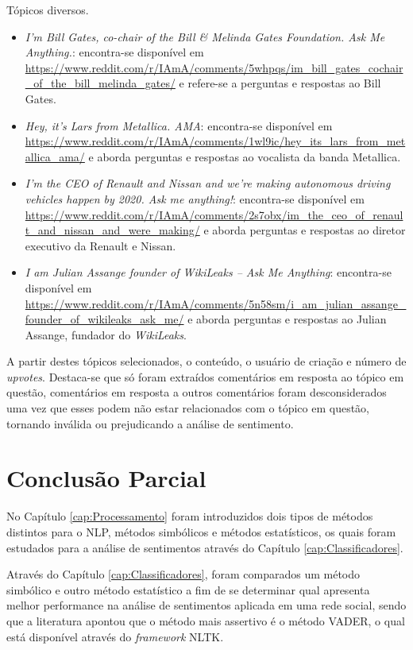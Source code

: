 Tópicos diversos.
\begin{itemize}
  \item
  \textit{I’m Bill Gates, co-chair of the Bill \& Melinda Gates Foundation. Ask
  Me Anything.}: encontra-se disponível em
  \url{https://www.reddit.com/r/IAmA/comments/5whpqs/im_bill_gates_cochair_of_the_bill_melinda_gates/}
  e refere-se a perguntas e respostas ao Bill Gates.
  \item
  \textit{Hey, it's Lars from Metallica. AMA}: encontra-se disponível em
  \url{https://www.reddit.com/r/IAmA/comments/1wl9ic/hey_its_lars_from_metallica_ama/}
  e aborda perguntas e respostas ao vocalista da banda Metallica.
  
  \item
  \textit{I'm the CEO of Renault and Nissan and we're making autonomous driving
  vehicles happen by 2020. Ask me anything!}: encontra-se disponível em
  \url{https://www.reddit.com/r/IAmA/comments/2s7obx/im_the_ceo_of_renault_and_nissan_and_were_making/}
  e aborda perguntas e respostas ao diretor executivo da Renault e Nissan.
  
  \item
  \textit{I am Julian Assange founder of WikiLeaks -- Ask Me Anything}:
  encontra-se disponível em
  \url{https://www.reddit.com/r/IAmA/comments/5n58sm/i_am_julian_assange_founder_of_wikileaks_ask_me/}
  e aborda perguntas e respostas ao Julian Assange, fundador do
  \textit{WikiLeaks}.
  
\end{itemize}


A partir destes tópicos selecionados, o conteúdo, o usuário de criação e número
de \textit{upvotes}. Destaca-se que só foram extraídos comentários
em resposta ao tópico em questão, comentários em resposta a outros comentários
foram desconsiderados uma vez que esses podem não estar relacionados com o
tópico em questão, tornando inválida ou prejudicando a análise de sentimento.


\section{Conclusão Parcial}

No Capítulo \ref{cap:Processamento} foram introduzidos dois tipos de métodos
distintos para o \ac{NLP}, métodos simbólicos e
métodos estatísticos, os quais foram estudados para a análise de sentimentos
através do Capítulo \ref{cap:Classificadores}.

Através do Capítulo \ref{cap:Classificadores}, foram comparados um método
simbólico e outro método estatístico a fim de se determinar qual apresenta melhor performance na análise de sentimentos
aplicada em uma rede social, sendo que a literatura apontou que o método mais
assertivo é o método \ac{VADER}, o qual está disponível através do
\textit{framework} \ac{NLTK}.

